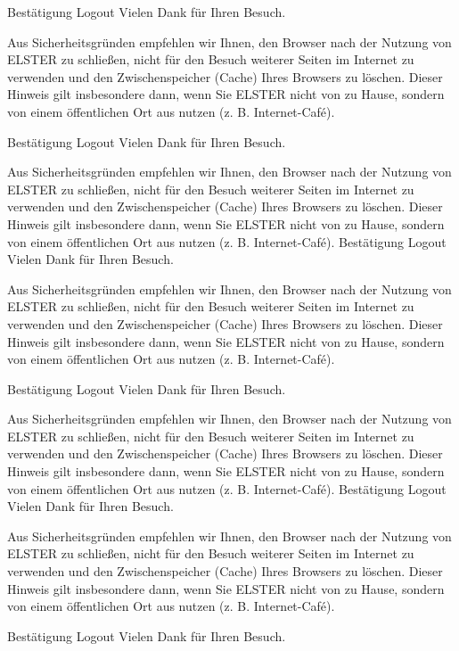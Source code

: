 \documentclass[11pt]{scrlttr2}
\begin{document}
\begin{letter}{}
        Bestätigung Logout
        Vielen Dank für Ihren Besuch.

        Aus Sicherheitsgründen empfehlen wir Ihnen, den Browser nach der Nutzung von ELSTER zu schließen, nicht für den Besuch weiterer Seiten im Internet zu verwenden und den Zwischenspeicher (Cache) Ihres Browsers zu löschen. Dieser Hinweis gilt insbesondere dann, wenn Sie ELSTER nicht von zu Hause, sondern von einem öffentlichen Ort aus nutzen (z. B. Internet-Café).

        Bestätigung Logout
        Vielen Dank für Ihren Besuch.

        Aus Sicherheitsgründen empfehlen wir Ihnen, den Browser nach der Nutzung von ELSTER zu schließen, nicht für den Besuch weiterer Seiten im Internet zu verwenden und den Zwischenspeicher (Cache) Ihres Browsers zu löschen. Dieser Hinweis gilt insbesondere dann, wenn Sie ELSTER nicht von zu Hause, sondern von einem öffentlichen Ort aus nutzen (z. B. Internet-Café).
        Bestätigung Logout
        Vielen Dank für Ihren Besuch.

        Aus Sicherheitsgründen empfehlen wir Ihnen, den Browser nach der Nutzung von ELSTER zu schließen, nicht für den Besuch weiterer Seiten im Internet zu verwenden und den Zwischenspeicher (Cache) Ihres Browsers zu löschen. Dieser Hinweis gilt insbesondere dann, wenn Sie ELSTER nicht von zu Hause, sondern von einem öffentlichen Ort aus nutzen (z. B. Internet-Café).

        Bestätigung Logout
        Vielen Dank für Ihren Besuch.

        Aus Sicherheitsgründen empfehlen wir Ihnen, den Browser nach der Nutzung von ELSTER zu schließen, nicht für den Besuch weiterer Seiten im Internet zu verwenden und den Zwischenspeicher (Cache) Ihres Browsers zu löschen. Dieser Hinweis gilt insbesondere dann, wenn Sie ELSTER nicht von zu Hause, sondern von einem öffentlichen Ort aus nutzen (z. B. Internet-Café).
        Bestätigung Logout
        Vielen Dank für Ihren Besuch.

        Aus Sicherheitsgründen empfehlen wir Ihnen, den Browser nach der Nutzung von ELSTER zu schließen, nicht für den Besuch weiterer Seiten im Internet zu verwenden und den Zwischenspeicher (Cache) Ihres Browsers zu löschen. Dieser Hinweis gilt insbesondere dann, wenn Sie ELSTER nicht von zu Hause, sondern von einem öffentlichen Ort aus nutzen (z. B. Internet-Café).

        Bestätigung Logout
        Vielen Dank für Ihren Besuch.


\end{letter}
\end{document}
